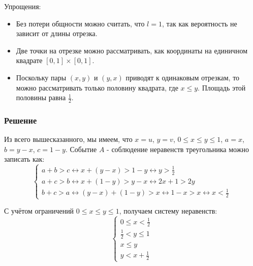 \documentclass[a4paper,14pt]{extarticle}
\begin{document}
                Упрощения:
                \begin{itemize}
                    \item Без потери общности можно считать, что \( l = 1 \), так как вероятность не зависит от длины отрезка.
                    \item Две точки на отрезке можно рассматривать, как координаты на единичном квадрате \( [0, 1] \times [0, 1] \).
                    \item Поскольку пары \( (x, y) \) и \( (y, x) \) приводят к одинаковым отрезкам, то можно рассматривать только половину квадрата, где \( x \leq y \). Площадь этой половины равна \( \frac{1}{2} \).
                \end{itemize}
            
            \subsubsection*{Решение}
                
                Из всего вышесказанного, мы имеем, что \( x = u \), \( y = v \), \( 0 \leq x \leq y \leq 1 \), \(a = x\), \(b = y - x\), \(c = 1 - y\). Событие \( A \) - соблюдение неравенств треугольника можно записать как:
                \[
                    \begin{cases}
                        a + b > c
                        \leftrightarrow
                        x + (y - x) > 1 - y
                        \leftrightarrow
                        y > \frac{1}{2} \\
                        a + c > b
                        \leftrightarrow
                        x + (1 - y) > y - x
                        \leftrightarrow 2x + 1 > 2y
                        \\
                        b + c > a
                        \leftrightarrow
                        (y - x) + (1 - y) > x
                        \leftrightarrow
                        1 - x > x
                        \leftrightarrow
                        x < \frac{1}{2}
                    \end{cases}
                \]
                
                С учётом ограничений \( 0 \leq x \leq y \leq 1 \), получаем систему неравенств:
                \[
                    \begin{cases}
                        0 \leq x < \frac{1}{2} \\
                        \frac{1}{2} < y \leq 1 \\
                        x \leq y \\
                        y < x + \frac{1}{2}
                    \end{cases}
                \]
                
\end{document}
